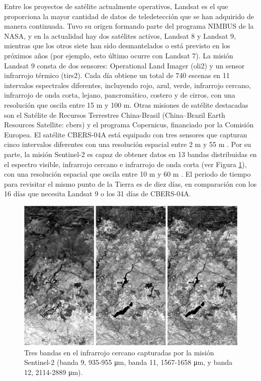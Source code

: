 Entre los proyectos de satélite actualmente operativos, Landsat es el que proporciona la mayor cantidad de datos de teledetección que se han adquirido de manera continuada. Tuvo su origen formando parte del programa NIMBUS de la NASA, y en la actualidad hay dos satélites activos, Landsat 8 y Landsat 9, mientras que los otros siete han sido desmantelados o está previsto en los próximos años (por ejemplo, esto último ocurre con Landsat 7). La misión Landsat 9 consta de dos sensores: Operational Land Imager (\acrshort{oli2}) y un sensor infrarrojo térmico (\acrshort{tirs2}). Cada día obtiene un total de 740 escenas en 11 intervalos espectrales diferentes, incluyendo rojo, azul, verde, infrarrojo cercano, infrarrojo de onda corta, lejano, pancromático, costero y de cirros, con una resolución que oscila entre 15 \si{\meter} y 100 \si{\meter}. Otras misiones de satélite destacadas son el Satélite de Recursos Terrestres China-Brasil (China–Brazil Earth Resources Satellite: \acrshort{cbers}) y el programa Copernicus, financiado por la Comisión Europea. El satélite CBERS-04A está equipado con tres sensores que capturan cinco intervalos diferentes con una resolución espacial entre 2 \si{\meter} y 55 \si{\meter} \cite{instituto_nacional_de_pesquisas_espaciais_inpecbers_2019}. Por su parte, la misión Sentinel-2 es capaz de obtener datos en 13 bandas distribuidas en el espectro visible, infrarrojo cercano e infrarrojo de onda corta (ver Figura \ref{fig:sentinel2_spanish}), con una resolución espacial que oscila entre 10 \si{\meter} y 60 \si{\meter} \cite{european_environment_agency_eu_2017}. El periodo de tiempo para revisitar el mismo punto de la Tierra es de diez días, en comparación con los 16 días que necesita Landsat 9 o los 31 días de CBERS-04A.

\begin{figure}[!ht]
	\includegraphics{figs/introduction/sentinel2_bands.png}
	\caption{Tres bandas en el infrarrojo cercano capturadas por la misión Sentinel-2 (banda 9, 935-955 \si{\micro\meter}, banda 11, 1567-1658 \si{\micro\meter}, y banda 12, 2114-2889 \si{\micro\meter}). }
    \label{fig:sentinel2_spanish}
\end{figure}

